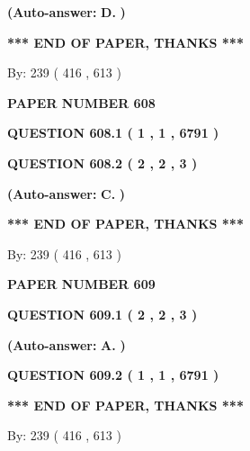 \documentclass[12pt]{article}
\begin{document}
 
{\textbf{(Auto-answer:}}
{\textbf{\large{
D.}}}
{\textbf{)}}
 
 
   
   
   
   
\vspace{1.0in} 
{\textbf{\large{ *** END OF PAPER, THANKS *** }}} 
   
   
\hspace{1.0in} By: 
 239 ( 416 ,  613 )
   
   
   
   
\newpage 
\setcounter{page}{ 
   608001 } 
   
   
 {\textbf{ \Large{ PAPER NUMBER  608  }}}
   
   
   
   
  
  
{\textbf{\large{QUESTION
608.1 
 ( 1 , 1 , 6791 )
}}}
  
  
{\textbf{\large{QUESTION
608.2 
 ( 2 , 2 , 3 )
}}}
 
 
{\textbf{(Auto-answer:}}
{\textbf{\large{
C.}}}
{\textbf{)}}
 
 
   
   
   
   
\vspace{1.0in} 
{\textbf{\large{ *** END OF PAPER, THANKS *** }}} 
   
   
\hspace{1.0in} By: 
 239 ( 416 ,  613 )
   
   
   
   
\newpage 
\setcounter{page}{ 
   609001 } 
   
   
 {\textbf{ \Large{ PAPER NUMBER  609  }}}
   
   
   
   
  
  
{\textbf{\large{QUESTION
609.1 
 ( 2 , 2 , 3 )
}}}
 
 
{\textbf{(Auto-answer:}}
{\textbf{\large{
A.}}}
{\textbf{)}}
 
 
  
  
{\textbf{\large{QUESTION
609.2 
 ( 1 , 1 , 6791 )
}}}
   
   
   
   
\vspace{1.0in} 
{\textbf{\large{ *** END OF PAPER, THANKS *** }}} 
   
   
\hspace{1.0in} By: 
 239 ( 416 ,  613 )
   
   
   
   
\newpage 
\setcounter{page}{ 
   610001 } 
   
\end{document}
